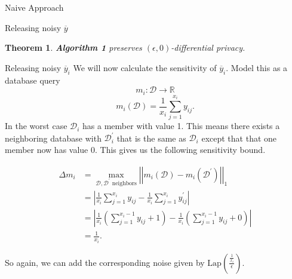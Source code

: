 \documentclass[11pt]{article}
\newtheorem{theorem}{Theorem}
\begin{document}
\begin{section}{Naive Approach}
\begin{subsection}{Releasing noisy $\overline{y}$}
\begin{theorem}{}
\textbf{Algorithm 1} preserves $(\epsilon,0)$-differential privacy.
\end{theorem}
\end{subsection}

\begin{subsection}{Releasing noisy $\overline{y}_i$}
We will now calculate the sensitivity of $\overline{y}_i$. Model this as a 
database query 
\[
m_i : \mathcal{D}\to \mathbb{R}
\]
\[
m_i(\mathcal{D}) = \frac{1}{x_i} \sum_{j=1}^{x_i} y_{ij}.
\]
In the worst case $\mathcal{D}_i$ has a member with value 1. This means 
there exists a neighboring database with $\mathcal{D}_i^{'}$ that is the 
same as $\mathcal{D}_i$ except that that one member now has value 0. This 
gives us the following sensitivity bound.

\begin{align*}
\Delta m_i &= \max_{\mathcal{D},\mathcal{D}^{'} \text{ neighbors}}
  \left|\left|
    m_i(\mathcal{D}) - m_i(\mathcal{D}^{'})
  \right|\right|_1\\
&= \left|
     \frac{1}{x_i} \sum_{j=1}^{x_i} y_{ij} - 
     \frac{1}{x_i} \sum_{j=1}^{x_i} y_{ij}^{'}
   \right|\\
&= \left|
     \frac{1}{x_i} 
     \left(
       \sum_{j=1}^{x_i - 1} y_{ij} + 1
     \right) -
     \frac{1}{x_i}
     \left(
       \sum_{j=1}^{x_i - 1} y_{ij} + 0
     \right)
   \right|\\
&= \frac{1}{x_i}.
\end{align*}

So again, we can add the corresponding noise given by 
$\text{Lap}(\frac{\frac{1}{x_i}}{\epsilon})$.

\end{subsection}



\end{section}
\end{document}
